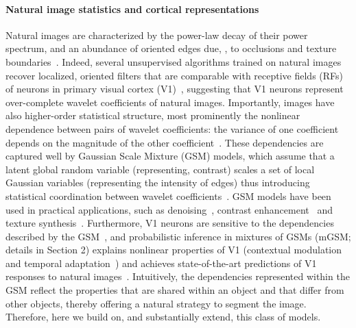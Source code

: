 \documentclass[a4paper,12pt]{article}
\begin{document}
\paragraph{Natural image statistics and cortical representations} Natural images are characterized by the power-law decay of their power spectrum, and an abundance of oriented edges due, \eg, to occlusions and texture boundaries~\cite{torralba2003statistics,aaponatural}. Indeed, several unsupervised algorithms trained on natural images recover localized, oriented filters that are comparable with receptive fields (RFs) of neurons in primary visual cortex (V1)~\cite{olshausen1996emergence,bell1997independent}, suggesting that V1 neurons represent over-complete wavelet coefficients of natural images. Importantly, images have also higher-order statistical structure, most prominently the nonlinear dependence between pairs of wavelet coefficients: the variance of one coefficient depends on the magnitude of the other coefficient~\cite{wainwright2000scale}. These dependencies are captured well by Gaussian Scale Mixture (GSM) models, which assume that a latent global random variable (representing, \eg contrast) scales a set of local Gaussian variables (representing the intensity of edges) thus introducing statistical coordination between wavelet coefficients~\cite{wainwright2000scale}. GSM models have been used in practical applications, such as denoising~\cite{portilla2003image,rakvongthai2010complex}, contrast enhancement~\cite{lyu2008nonlinear} and texture synthesis~\cite{theis2012mixtures}. Furthermore, V1 neurons are sensitive to the dependencies described by the GSM~\cite{schwartz2001natural}, and probabilistic inference in mixtures of GSMs (mGSM; details in Section 2) explains nonlinear properties of V1 (\eg contextual modulation~\cite{coen2009statistical,Coen-Cagli2012} and temporal adaptation~\cite{snow2016specificity}) and achieves state-of-the-art predictions of V1 responses to natural images~\cite{coen2015flexible}. Intuitively, the dependencies represented within the GSM reflect the properties that are shared within an object and that differ from other objects, thereby offering a natural strategy to segment the image. Therefore, here we build on, and substantially extend, this class of models.
\end{document}
